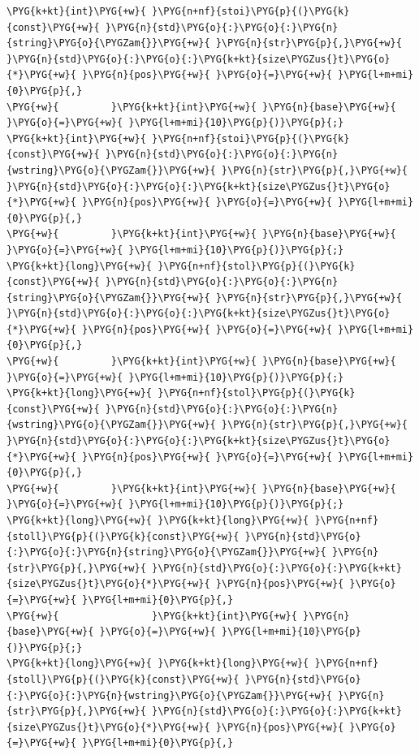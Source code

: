 \begin{codeblockbg}
\begin{Verbatim}[commandchars=\\\{\},breaklines=true,breakanywhere=true,fontsize=\codefont,xleftmargin=17bp]
\PYG{k+kt}{int}\PYG{+w}{ }\PYG{n+nf}{stoi}\PYG{p}{(}\PYG{k}{const}\PYG{+w}{ }\PYG{n}{std}\PYG{o}{:}\PYG{o}{:}\PYG{n}{string}\PYG{o}{\PYGZam{}}\PYG{+w}{ }\PYG{n}{str}\PYG{p}{,}\PYG{+w}{ }\PYG{n}{std}\PYG{o}{:}\PYG{o}{:}\PYG{k+kt}{size\PYGZus{}t}\PYG{o}{*}\PYG{+w}{ }\PYG{n}{pos}\PYG{+w}{ }\PYG{o}{=}\PYG{+w}{ }\PYG{l+m+mi}{0}\PYG{p}{,}
\PYG{+w}{         }\PYG{k+kt}{int}\PYG{+w}{ }\PYG{n}{base}\PYG{+w}{ }\PYG{o}{=}\PYG{+w}{ }\PYG{l+m+mi}{10}\PYG{p}{)}\PYG{p}{;}
\PYG{k+kt}{int}\PYG{+w}{ }\PYG{n+nf}{stoi}\PYG{p}{(}\PYG{k}{const}\PYG{+w}{ }\PYG{n}{std}\PYG{o}{:}\PYG{o}{:}\PYG{n}{wstring}\PYG{o}{\PYGZam{}}\PYG{+w}{ }\PYG{n}{str}\PYG{p}{,}\PYG{+w}{ }\PYG{n}{std}\PYG{o}{:}\PYG{o}{:}\PYG{k+kt}{size\PYGZus{}t}\PYG{o}{*}\PYG{+w}{ }\PYG{n}{pos}\PYG{+w}{ }\PYG{o}{=}\PYG{+w}{ }\PYG{l+m+mi}{0}\PYG{p}{,}
\PYG{+w}{         }\PYG{k+kt}{int}\PYG{+w}{ }\PYG{n}{base}\PYG{+w}{ }\PYG{o}{=}\PYG{+w}{ }\PYG{l+m+mi}{10}\PYG{p}{)}\PYG{p}{;}
\PYG{k+kt}{long}\PYG{+w}{ }\PYG{n+nf}{stol}\PYG{p}{(}\PYG{k}{const}\PYG{+w}{ }\PYG{n}{std}\PYG{o}{:}\PYG{o}{:}\PYG{n}{string}\PYG{o}{\PYGZam{}}\PYG{+w}{ }\PYG{n}{str}\PYG{p}{,}\PYG{+w}{ }\PYG{n}{std}\PYG{o}{:}\PYG{o}{:}\PYG{k+kt}{size\PYGZus{}t}\PYG{o}{*}\PYG{+w}{ }\PYG{n}{pos}\PYG{+w}{ }\PYG{o}{=}\PYG{+w}{ }\PYG{l+m+mi}{0}\PYG{p}{,}
\PYG{+w}{         }\PYG{k+kt}{int}\PYG{+w}{ }\PYG{n}{base}\PYG{+w}{ }\PYG{o}{=}\PYG{+w}{ }\PYG{l+m+mi}{10}\PYG{p}{)}\PYG{p}{;}
\PYG{k+kt}{long}\PYG{+w}{ }\PYG{n+nf}{stol}\PYG{p}{(}\PYG{k}{const}\PYG{+w}{ }\PYG{n}{std}\PYG{o}{:}\PYG{o}{:}\PYG{n}{wstring}\PYG{o}{\PYGZam{}}\PYG{+w}{ }\PYG{n}{str}\PYG{p}{,}\PYG{+w}{ }\PYG{n}{std}\PYG{o}{:}\PYG{o}{:}\PYG{k+kt}{size\PYGZus{}t}\PYG{o}{*}\PYG{+w}{ }\PYG{n}{pos}\PYG{+w}{ }\PYG{o}{=}\PYG{+w}{ }\PYG{l+m+mi}{0}\PYG{p}{,}
\PYG{+w}{         }\PYG{k+kt}{int}\PYG{+w}{ }\PYG{n}{base}\PYG{+w}{ }\PYG{o}{=}\PYG{+w}{ }\PYG{l+m+mi}{10}\PYG{p}{)}\PYG{p}{;}
\PYG{k+kt}{long}\PYG{+w}{ }\PYG{k+kt}{long}\PYG{+w}{ }\PYG{n+nf}{stoll}\PYG{p}{(}\PYG{k}{const}\PYG{+w}{ }\PYG{n}{std}\PYG{o}{:}\PYG{o}{:}\PYG{n}{string}\PYG{o}{\PYGZam{}}\PYG{+w}{ }\PYG{n}{str}\PYG{p}{,}\PYG{+w}{ }\PYG{n}{std}\PYG{o}{:}\PYG{o}{:}\PYG{k+kt}{size\PYGZus{}t}\PYG{o}{*}\PYG{+w}{ }\PYG{n}{pos}\PYG{+w}{ }\PYG{o}{=}\PYG{+w}{ }\PYG{l+m+mi}{0}\PYG{p}{,}
\PYG{+w}{                }\PYG{k+kt}{int}\PYG{+w}{ }\PYG{n}{base}\PYG{+w}{ }\PYG{o}{=}\PYG{+w}{ }\PYG{l+m+mi}{10}\PYG{p}{)}\PYG{p}{;}
\PYG{k+kt}{long}\PYG{+w}{ }\PYG{k+kt}{long}\PYG{+w}{ }\PYG{n+nf}{stoll}\PYG{p}{(}\PYG{k}{const}\PYG{+w}{ }\PYG{n}{std}\PYG{o}{:}\PYG{o}{:}\PYG{n}{wstring}\PYG{o}{\PYGZam{}}\PYG{+w}{ }\PYG{n}{str}\PYG{p}{,}\PYG{+w}{ }\PYG{n}{std}\PYG{o}{:}\PYG{o}{:}\PYG{k+kt}{size\PYGZus{}t}\PYG{o}{*}\PYG{+w}{ }\PYG{n}{pos}\PYG{+w}{ }\PYG{o}{=}\PYG{+w}{ }\PYG{l+m+mi}{0}\PYG{p}{,}

\end{Verbatim}
\end{codeblockbg}
